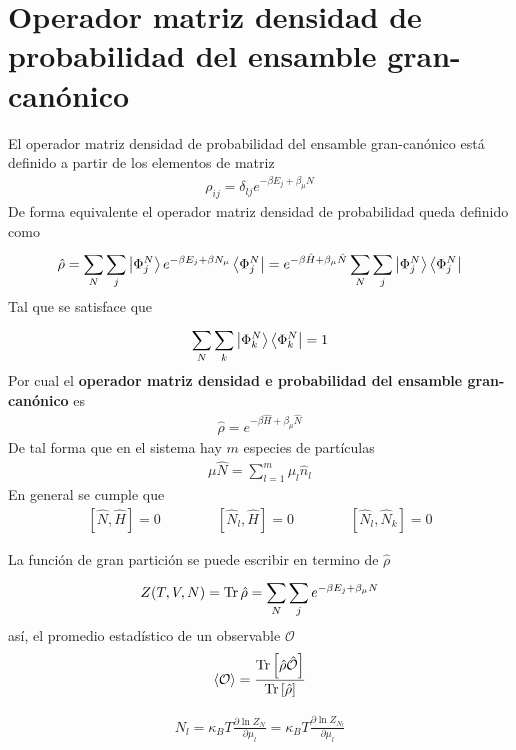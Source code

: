 \documentclass{article}
\begin{document}
\section{Operador matriz densidad de probabilidad del ensamble gran-canónico }
El operador matriz densidad de probabilidad del ensamble gran-canónico está definido a partir de los elementos de matriz 
\begin{gather*}
  \rho _{ij }  = \delta _{lj }  e ^ {-\beta E_j + \beta_\mu N } 
\end{gather*}
De forma equivalente el operador matriz densidad de probabilidad queda definido como 
\begin{gather*}
  \hat \rho = \displaystyle\sum_{N }^{} \displaystyle\sum_{j }^{} \ket{\Phi_j^N } e ^ {- \beta E_j + \beta N_\mu } \bra{\Phi_j ^N } = e ^ {-\beta\hat H + \beta_\mu \hat N } \displaystyle\sum_{N }^{} \displaystyle\sum_{j }^{} \ket{\Phi_j^N } \bra{\Phi_j^N} 
\end{gather*}
Tal que se satisface que 
\begin{gather*}
   \displaystyle\sum_{N }^{} \displaystyle\sum_{k }^{} \ket{\Phi_k^N } \bra{\Phi_k^N} = 1
\end{gather*}
Por cual el \textbf{operador matriz densidad e probabilidad del ensamble gran-canónico } es  
\begin{gather*}
  \hat \rho = e ^ {-\beta\hat H + \beta_\mu \hat N } 
\end{gather*}
De tal forma que en el sistema hay $ m  $ especies de partículas 
\begin{gather*}
  \mu\hat N = \displaystyle\sum_{l= 1 }^{m } \mu_l \hat n _l  
\end{gather*}
En general se cumple que 
\begin{gather*}
  \left[ \hat{N} , \hat H   \right] = 0 \qquad \qquad \left[ \hat N_l  , \hat H   \right] = 0 \qquad \qquad \left[ \hat N_l  , \hat N_k   \right] = 0  
\end{gather*}

\hfill 

\hfill 

La función de gran partición se puede escribir en termino de $ \hat \rho  $ 
\begin{gather*}
  Z(T,V,N) = \Tr \hat \rho  = \displaystyle\sum_{N }^{} \displaystyle\sum_{j }^{} e ^ {- \beta E_j + \beta_\mu N  } 
\end{gather*}
así, el promedio estadístico de un observable $ \mathcal O  $ 
\begin{gather*}
  \expval{\mathcal O } = \frac{\Tr \left[\hat{\rho} \hat{\mathcal{O}} \right]}{\Tr \left[\hat \rho \right]}
\end{gather*}

\hfill 

\hfill 

\begin{gather*}
  N_l = \kappa_B T \frac{\partial \ln Z_N  }{\partial \mu_l } = \kappa_B T \frac{\partial \ln Z_{N_l } }{\partial \mu_l } 
\end{gather*} 





\section{}
\end{document}
